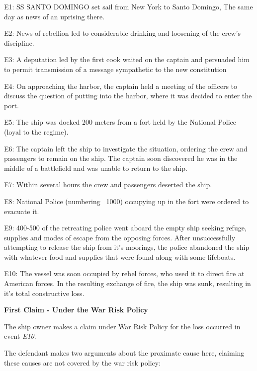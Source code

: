 E1: SS SANTO DOMINGO set sail from New York to Santo Domingo, The same day as news of an uprising there.

E2: News of rebellion led to considerable drinking and loosening of the crew's discipline. 

E3: A deputation led by the first cook waited on the captain and persuaded him to permit transmission of a message sympathetic to the new constitution

E4: On approaching the harbor, the captain held a meeting of the officers to discuss the question of putting into the harbor, where it was decided to enter the port.

E5: The ship was docked 200 meters from a fort held by the National Police (loyal to the regime).

E6: The captain left the ship to investigate the situation, ordering the crew and passengers to remain on the ship. The captain soon discovered he was in the middle of a battlefield and was unable to return to the ship. 

E7: Within several hours the crew and passengers deserted the ship.

E8: National Police (numbering ~1000) occupying up in the fort were ordered to evacuate it.  

E9: 400-500 of the retreating police went aboard the empty ship seeking refuge, supplies and modes of escape from the opposing forces. After unsuccessfully attempting to release the ship from it's moorings, the police abandoned the ship with whatever food and supplies that were found along with some lifeboats.

E10: The vessel was soon occupied by rebel forces, who used it to direct fire at American forces. In the resulting exchange of fire, the ship was sunk, resulting in it's total constructive loss.


\textbf{First Claim - Under the War Risk Policy}

    The ship owner makes a claim under War Risk Policy for the loss occurred in event \textit{E10}.
    
    The defendant makes two arguments about the proximate cause here, claiming these causes are not covered by the war risk policy:
    

